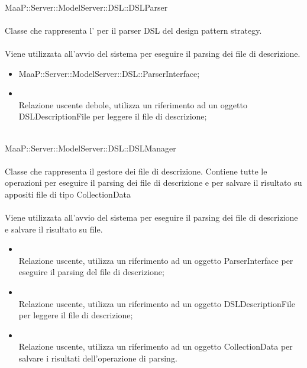 \\
MaaP::Server::ModelServer::DSL::DSLParser\\
\\
Classe che rappresenta l' per il parser DSL del design pattern strategy.\\
\\
Viene utilizzata all'avvio del sistema per eseguire il parsing dei file di descrizione.
\begin{itemize}
\item MaaP::Server::ModelServer::DSL::ParserInterface;
\end{itemize}
\begin{itemize}
\item{}\\
Relazione uscente debole, utilizza un riferimento ad un oggetto DSLDescriptionFile per leggere il file di descrizione;
\end{itemize}

\\
MaaP::Server::ModelServer::DSL::DSLManager\\
\\
Classe che rappresenta il gestore dei file di descrizione. Contiene tutte le operazioni per eseguire il parsing dei file di descrizione e per salvare il risultato su appositi file di tipo CollectionData\\
\\
Viene utilizzata all'avvio del sistema per eseguire il parsing dei file di descrizione e salvare il risultato su file.
\begin{itemize}
\item{}\\
Relazione uscente, utilizza un riferimento ad un oggetto ParserInterface per eseguire il parsing del file di descrizione;
\item{}\\
Relazione uscente, utilizza un riferimento ad un oggetto DSLDescriptionFile per leggere il file di descrizione;
\item{}\\
Relazione uscente, utilizza un riferimento ad un oggetto CollectionData per salvare i risultati dell'operazione di parsing.
\end{itemize}

